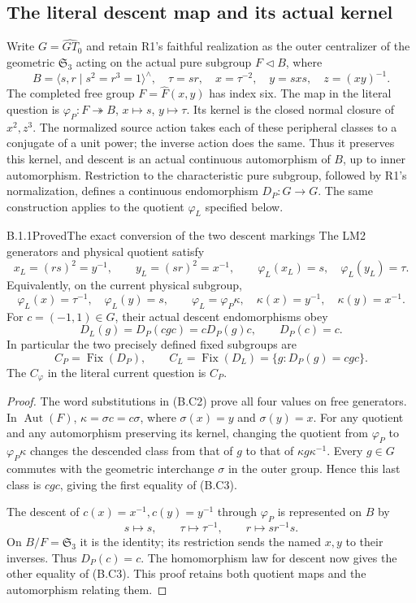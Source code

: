 \subsection{The literal descent map and its actual kernel}

Write $G=\widehat{GT}_0$ and retain R1's faithful realization as
the outer centralizer of the geometric $\mathfrak S_3$ acting
on the actual pure subgroup $F\triangleleft B$, where
\[
 B=\langle s,r\mid s^2=r^3=1\rangle^{\wedge},\quad
 \tau=sr,\quad x=\tau^{-2},\quad y=sxs,\quad z=(xy)^{-1}.
 \tag{B.C1}
\]
The completed free group $F=\widehat F(x,y)$ has index six.
The map in the literal question is
$\varphi_P:F\twoheadrightarrow B$, $x\mapsto s$, $y\mapsto\tau$.
Its kernel is the closed normal closure of $x^2,z^3$.
The normalized source action takes each of these peripheral
classes to a conjugate of a unit power; the inverse action
does the same.  Thus it preserves this kernel, and descent
is an actual continuous automorphism of $B$, up to inner
automorphism.  Restriction to the characteristic pure subgroup,
followed by R1's normalization, defines a continuous
endomorphism $D_P:G\to G$.  The same construction applies to
the quotient $\varphi_L$ specified below.

\begin{result}{B.1.1}{Proved}{The exact conversion of the two descent markings}
The LM2 generators and physical quotient satisfy
\[
 x_L=(rs)^2=y^{-1},\qquad y_L=(sr)^2=x^{-1},\qquad
 \varphi_L(x_L)=s,\quad\varphi_L(y_L)=\tau.
\]
Equivalently, on the current physical subgroup,
\[
 \varphi_L(x)=\tau^{-1},\quad\varphi_L(y)=s,
 \qquad\varphi_L=\varphi_P\kappa,\quad
 \kappa(x)=y^{-1},\quad\kappa(y)=x^{-1}.
 \tag{B.C2}
\]
For $c=(-1,1)\in G$, their actual descent endomorphisms obey
\[
 D_L(g)=D_P(cgc)=cD_P(g)c,\qquad D_P(c)=c.                 \tag{B.C3}
\]
In particular the two precisely defined fixed subgroups are
\[
 C_P=\operatorname{Fix}(D_P),\qquad
 C_L=\operatorname{Fix}(D_L)=\{g:D_P(g)=cgc\}.
 \tag{B.C4}
\]
The $C_\varphi$ in the literal current question is $C_P$.
\end{result}
\begin{proof}
The word substitutions in (B.C2) prove all four values on
free generators.  In $\operatorname{Aut}(F)$,
$\kappa=\sigma c=c\sigma$, where $\sigma(x)=y$ and
$\sigma(y)=x$.  For any quotient and any automorphism
preserving its kernel, changing the quotient from $\varphi_P$
to $\varphi_P\kappa$ changes the descended class from that
of $g$ to that of $\kappa g\kappa^{-1}$.  Every $g\in G$
commutes with the geometric interchange $\sigma$ in the
outer group.  Hence this last class is $cgc$, giving the first
equality of (B.C3).

The descent of $c(x)=x^{-1},c(y)=y^{-1}$ through
$\varphi_P$ is represented on $B$ by
\[
 s\mapsto s,\qquad \tau\mapsto\tau^{-1},\qquad
 r\mapsto sr^{-1}s.
 \tag{B.C5}
\]
On $B/F=\mathfrak S_3$ it is the identity; its restriction
sends the named $x,y$ to their inverses.  Thus $D_P(c)=c$.
The homomorphism law for descent now gives the other equality
of (B.C3).  This proof retains both quotient maps and the
automorphism relating them.
\end{proof}

